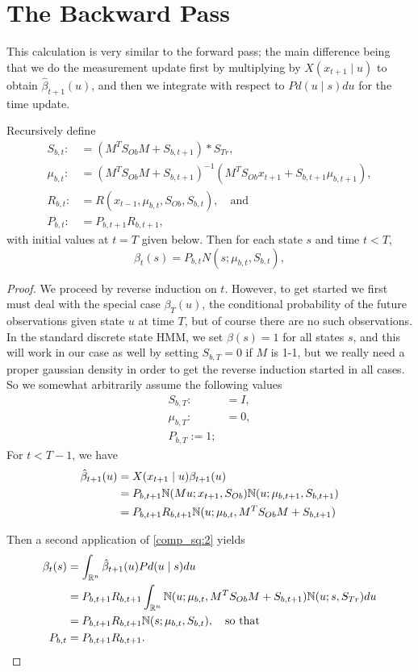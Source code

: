 \documentclass[12pt,leqno]{article}
\begin{document}
\section{The Backward Pass}
This calculation is very similar to the forward pass; the main difference being that we do
the measurement update first by multiplying by $X(x_{t+1}\mid u)$ to obtain $\hat{\beta}_{t+1}(u)$,
and then we integrate with respect to $Pd(u\mid s)du$ for the time update.  

\begin{Thm}\label{beta:1}
  Recursively define
\begin{align*}
  S_{b,t} :&= (M^TS_{Ob}M + S_{b,t+1})*S_{Tr},\\
  \mu_{b,t} :&= (M^TS_{Ob}M + S_{b,t+1})^{-1}(M^TS_{Ob}x_{t+1} + S_{b,t+1}\mu_{b,t+1}),\\
  R_{b,t} :&= R(x_{t-1},\mu_{b,t},S_{Ob},S_{b,t}),\quad\text{and}\\
  P_{b,t}:&=P_{b,t+1}R_{b,t+1},
\end{align*}
with initial values at $t = T$ given below. Then for each state $s$ and time $t < T$,
$$
  \beta_t(s) = P_{b,t}N(s;\mu_{b,t},S_{b,t}),
$$
\end{Thm}

\begin{proof}
We proceed by reverse induction on $t$. However, to get started we first must  deal with
the special case $\beta_{T}(u)$, the conditional probability of the future observations given
state $u$ at time $T$, but of course there are no such observations.  In the standard discrete
state HMM, we set $\beta(s) = 1$ for all states $s$, and this will work in our case as well by
setting $S_{b,T} = 0$ if $M$ is 1-1, but we really need a proper gaussian 
density in order to get the reverse induction started in all cases.  So we somewhat arbitrarily
assume the following values
\begin{align*}
  S_{b,T} :&= I,\\
  \mu_{b,T} :&= 0,\\
  P_{b,T} := 1;
\end{align*}
  For $t <  T-1$, we have 
  \begin{align*}
    \hat{\beta}_{t+1}(u) &= X(x_{t+1}\mid u)\beta_{t+1}(u)\\
    &= P_{b,t+1}{\mathbb N}(Mu;x_{t+1},S_{Ob}){\mathbb N}(u;\mu_{b,t+1},S_{b,t+1})\\
    &= P_{b,t+1}R_{b,t+1}{\mathbb N}(u;\mu_{b,t},M^TS_{Ob}M+S_{b,t+1})
  \end{align*}

  Then a second application of \eqref{comp_sq:2} yields
  \begin{align*}
    \beta_t(s) &= \int_{{\mathbb R}^n}\hat{\beta}_{t+1}(u)Pd(u\mid s)du \\
    &= P_{b,t+1}R_{b,t+1}\int_{{\mathbb R}^n}{\mathbb N}(u;\mu_{b,t},M^TS_{Ob}M + S_{b,t+1}){\mathbb N}(u;s,S_{Tr})du\\
    &=P_{b,t+1}R_{b,t+1}{\mathbb N}(s;\mu_{b,t},S_{b,t}),\quad\text{so that}\\
    P_{b,t} &= P_{b,t+1}R_{b,t+1}.
  \end{align*}
\end{proof}
\end{document}
